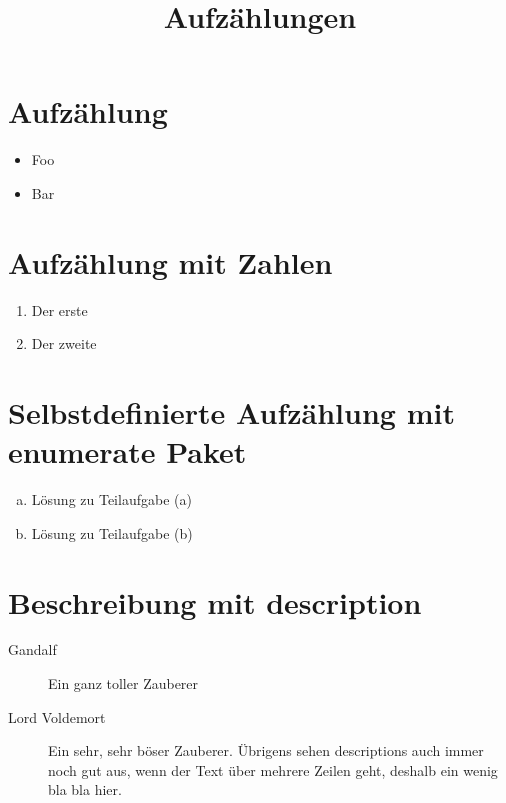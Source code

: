 \documentclass[a4paper]{scrartcl}
\title{Aufzählungen}
\author{}
\date{}
\begin{document}
\maketitle

\section*{Aufzählung}
\begin{itemize}
    \item Foo
    \item Bar
\end{itemize}

\section*{Aufzählung mit Zahlen}
\begin{enumerate}
    \item Der erste
    \item Der zweite
\end{enumerate}

\section*{Selbstdefinierte Aufzählung mit enumerate Paket}
\begin{enumerate}[(a)]
    \item Lösung zu Teilaufgabe (a)
    \item Lösung zu Teilaufgabe (b)
\end{enumerate}

\section*{Beschreibung mit description}
\begin{description}
    \item[Gandalf] Ein ganz toller Zauberer
    \item[Lord Voldemort] Ein sehr, sehr böser Zauberer.
    Übrigens sehen descriptions auch immer noch gut aus, wenn der Text über mehrere Zeilen geht, deshalb ein wenig bla bla hier.
\end{description}
\end{document}
